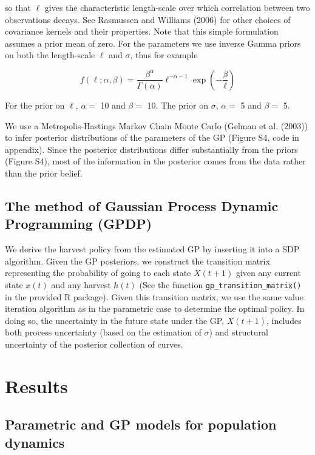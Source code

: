 \documentclass[author-year, 12pt,review]{components/elsarticle} %
\begin{document}
so that $\ell$ gives the characteristic length-scale over which
correlation between two observations decays. See Rasmussen and Williams
(2006) for other choices of covariance kernels and their properties.
Note that this simple formulation assumes a prior mean of zero. For the
parameters we use inverse Gamma priors on both the length-scale $\ell$
and $\sigma$, thus for example

\begin{equation}
f(\ell; \alpha, \beta) = \frac{\beta^\alpha}{\Gamma(\alpha)} \ell^{-\alpha - 1}\exp\left(-\frac{\beta}{\ell}\right)
\end{equation}

For the prior on $\ell$, $\alpha =$ 10 and $\beta =$ 10. The prior on
$\sigma$, $\alpha =$ 5 and $\beta =$ 5.

We use a Metropolis-Hastings Markov Chain Monte Carlo (Gelman et al.
(2003)) to infer posterior distributions of the parameters of the GP
(Figure S4, code in appendix). Since the posterior distributions differ
substantially from the priors (Figure S4), most of the information in
the posterior comes from the data rather than the prior belief.

\subsection{The method of Gaussian Process Dynamic Programming
(GPDP)}\label{the-method-of-gaussian-process-dynamic-programming-gpdp}

We derive the harvest policy from the estimated GP by inserting it into
a SDP algorithm. Given the GP posteriors, we construct the transition
matrix representing the probability of going to each state $X(t+1)$
given any current state $x(t)$ and any harvest $h(t)$ (See the function
\texttt{gp\_transition\_matrix()} in the provided R package). Given this
transition matrix, we use the same value iteration algorithm as in the
parametric case to determine the optimal policy. In doing so, the
uncertainty in the future state under the GP, $X(t+1)$, includes both
process uncertainty (based on the estimation of $\sigma$) and structural
uncertainty of the posterior collection of curves.

\section{Results}\label{results}

\subsection{Parametric and GP models for population
dynamics}\label{parametric-and-gp-models-for-population-dynamics}
\end{document}
